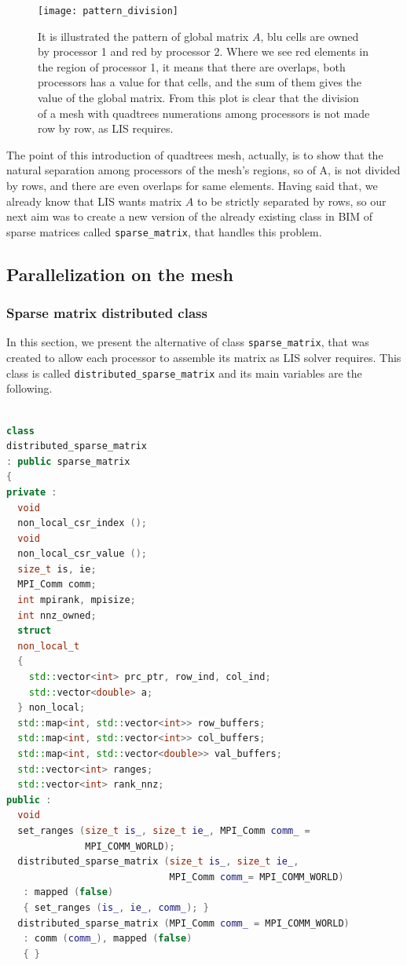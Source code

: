 \begin{figure}[h]
	
	\centering
	\texttt{[image: pattern\_division]}
	\caption[Patter of a matrix come from a mesh $ 5 \times 5 $ ]{It is illustrated the pattern of global matrix $ A $, blu cells are owned by processor 1 and red by processor 2. Where we see red elements in the region of processor 1, it means that there are overlaps, both processors has a value for that cells, and the sum of them gives the value of the global matrix. From this plot is clear that the division of a mesh with quadtrees numerations among processors is not made row by row, as LIS requires. }
	\label{patterndivision}
\end{figure}
The point of this introduction of quadtrees mesh, actually, is to show that the natural separation among processors of the mesh's regions, so of A, is not divided by rows, and there are even overlaps for same elements. Having said that, we already know that LIS wants matrix $ A $ to be strictly separated by rows, so our next aim was to create a new version of the already existing class in BIM of sparse matrices called \texttt{sparse\_matrix}, that handles this problem.
\subsection{Parallelization on the mesh}
\subsubsection{Sparse matrix distributed class}
In this section, we present the alternative of class \texttt{sparse\_matrix}, that was created to allow each processor to assemble its matrix as LIS solver requires. This class is called \texttt{distributed\_sparse\_matrix} and its main variables are the following. 
\\
\\
\begin{lstlisting}[language=C++, caption={class distributed\_sparse\_matrix}]
class
distributed_sparse_matrix
: public sparse_matrix
{
private :
  void
  non_local_csr_index ();
  void
  non_local_csr_value ();
  size_t is, ie;
  MPI_Comm comm;
  int mpirank, mpisize;
  int nnz_owned;
  struct
  non_local_t
  {
	std::vector<int> prc_ptr, row_ind, col_ind;
	std::vector<double> a;
  } non_local;
  std::map<int, std::vector<int>> row_buffers;
  std::map<int, std::vector<int>> col_buffers;
  std::map<int, std::vector<double>> val_buffers;
  std::vector<int> ranges;
  std::vector<int> rank_nnz;
public :
  void
  set_ranges (size_t is_, size_t ie_, MPI_Comm comm_ =     
              MPI_COMM_WORLD);
  distributed_sparse_matrix (size_t is_, size_t ie_,
                             MPI_Comm comm_= MPI_COMM_WORLD)
   : mapped (false)
   { set_ranges (is_, ie_, comm_); }
  distributed_sparse_matrix (MPI_Comm comm_ = MPI_COMM_WORLD)
   : comm (comm_), mapped (false)
   { }
\end{lstlisting}

